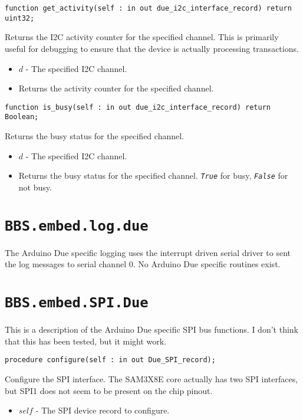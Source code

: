 \documentclass[10pt, openany]{book}
\newcommand{\indexfunc}[1]{\index[func]{#1}}
\newcommand{\package}[1]{\texttt{#1}}
\newcommand{\constant}[1]{\emph{\texttt{#1}}}
\begin{document}
\begin{lstlisting}
function get_activity(self : in out due_i2c_interface_record) return uint32;
\end{lstlisting}
\indexfunc{get\_activity}
Returns the I2C activity counter for the specified channel.  This is primarily useful for debugging to ensure that the device is actually processing transactions.
\begin{itemize}
  \item $d$ - The specified I2C channel.
  \item Returns the activity counter for the specified channel.
\end{itemize}

\begin{lstlisting}
function is_busy(self : in out due_i2c_interface_record) return Boolean;
\end{lstlisting}
\indexfunc{is\_busy}
Returns the busy status for the specified channel.
\begin{itemize}
  \item $d$ - The specified I2C channel.
  \item Returns the busy status for the specified channel.  \constant{True} for busy, \constant{False} for not busy.
\end{itemize}

\section{\package{BBS.embed.log.due}}
The Arduino Due specific logging uses the interrupt driven serial driver to sent the log messages to serial channel 0.  No Arduino Due specific routines exist.

\section{\package{BBS.embed.SPI.Due}}
This is a description of the Arduino Due specific SPI bus functions.  I don't think that this has been tested, but it might work.

\begin{lstlisting}
procedure configure(self : in out Due_SPI_record);
\end{lstlisting}
\indexfunc{configure}
Configure the SPI interface.  The SAM3X8E core actually has two SPI interfaces, but SPI1 does not seem to be present on the chip pinout.
\begin{itemize}
  \item $self$ - The SPI device record to configure.
\end{itemize}

\clearpage
%
%
\printindex[type]
\printindex[func]
%
%


\end{document}
